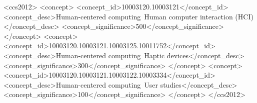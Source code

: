\documentclass[sigconf,review,anonymous]{acmart}
\begin{document}
\begin{CCSXML}
<ccs2012>
    <concept>
        <concept_id>10003120.10003121</concept_id>
        <concept_desc>Human-centered computing~Human computer interaction (HCI)</concept_desc>
        <concept_significance>500</concept_significance>
    </concept>
    <concept>
        <concept_id>10003120.10003121.10003125.10011752</concept_id>
        <concept_desc>Human-centered computing~Haptic devices</concept_desc>
        <concept_significance>300</concept_significance>
    </concept>
    <concept>
        <concept_id>10003120.10003121.10003122.10003334</concept_id>
        <concept_desc>Human-centered computing~User studies</concept_desc>
        <concept_significance>100</concept_significance>
    </concept>
</ccs2012>
\end{CCSXML}


\end{document}
